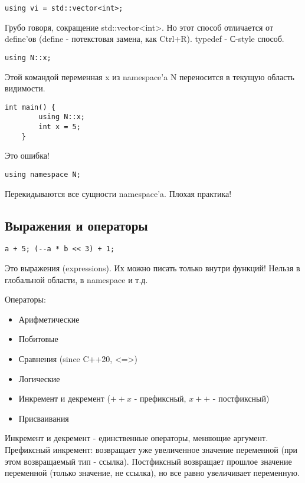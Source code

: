 \begin{Verbatim}[tabsize=4]
	using vi = std::vector<int>;
\end{Verbatim}

Грубо говоря, сокращение std::vector<int>. Но этот способ отличается от define'ов (define - потекстовая замена, как Ctrl+R). typedef - С-style способ.

\begin{Verbatim}[tabsize=4]
	using N::x;
\end{Verbatim}

Этой командой переменная x из namespace'a N переносится в текущую область видимости.

\begin{Verbatim}[tabsize=4]
	int main() {
		using N::x;
		int x = 5;
	}
\end{Verbatim}

Это ошибка!

\begin{Verbatim}[tabsize=4]
	using namespace N;
\end{Verbatim}

Перекидываются все сущности namespace'a. Плохая практика!


\subsection{Выражения и операторы}
\begin{Verbatim}[tabsize=4]
	a + 5; (--a * b << 3) + 1;
\end{Verbatim}

Это выражения (expressions). Их можно писать только внутри функций! Нельзя в глобальной области, в namespace и т.д.

Операторы:
\begin{itemize}
	\item Арифметические
	\item Побитовые
	\item Сравнения (since C++20, <=>)
	\item Логические
	\item Инкремент и декремент ($++x$ - префиксный, $x++$ - постфиксный)
	\item Присваивания	
\end{itemize}

Инкремент и декремент - единственные операторы, меняющие аргумент. Префиксный инкремент: возвращает уже увеличенное значение переменной (при этом возвращаемый тип - ссылка). Постфиксный возвращает прошлое значение переменной (только значение, не ссылка), но все равно увеличивает переменную.

